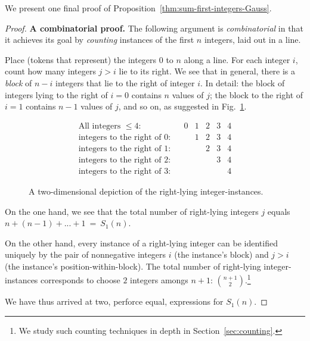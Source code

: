 \medskip

We present one final proof of
Proposition~\ref{thm:sum-first-integers-Gauss}.

\begin{proof}
{\bf A combinatorial proof.}
%
The following argument is {\it combinatorial} in that it achieves its
goal by {\em counting} instances of the first $n$ integers, laid out
in a line.

Place (tokens that represent) the integers $0$ to $n$ along a line.
For each integer $i$, count how many integers $j > i$ lie to its
right.  We see that in general, there is a {\it block} of $n-i$
integers that lie to the right of integer $i$.  In detail: the block
of integers lying to the right of $i=0$ contains $n$ values of $j$;
the block to the right of $i=1$ contains $n-1$ values of $j$, and so
on, as suggested in Fig.~\ref{fig:rightward-instances}.

\begin{figure}[htb]
\[
\begin{array}{lcccccc}
\mbox{All integers $\leq 4$:} &
 & 0 & 1 & 2 & 3 & 4 \\
\mbox{integers to the right of $0$:} &
 &   & 1 & 2 & 3 & 4 \\
\mbox{integers to the right of $1$:} &
 &   &   & 2 & 3 & 4 \\
\mbox{integers to the right of $2$:} &
 &   &   &   & 3 & 4 \\
\mbox{integers to the right of $3$:} &
 &   &   &   &   & 4
\end{array}
\]
\caption{A two-dimensional depiction of the right-lying
  integer-instances.}
\label{fig:rightward-instances}
\end{figure}

On the one hand, we see that the total number of right-lying integers
$j$ equals $n+(n-1)+ ... + 1 \ = \ S_1(n)$.

On the other hand, every instance of a right-lying integer can be
identified uniquely by the pair of nonnegative integers $i$ (the
instance's block) and $j>i$ (the instance's
position-within-block).  The total
number of right-lying integer-instances corresponds to choose $2$ integers amongs $n+1$:
$\displaystyle {n+1 \choose 2}$.\footnote{We study such counting
  techniques in depth in Section~\ref{sec:counting}.}

We have thus arrived at two, perforce equal, expressions for $S_1(n)$.
\end{proof}

